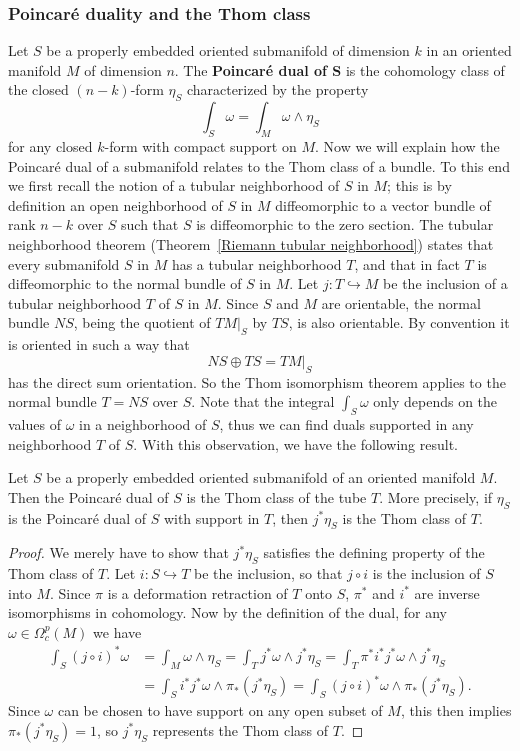 \subsubsection{Poincar\'e duality and the Thom class}
Let $S$ be a properly embedded oriented submanifold of dimension $k$ in an oriented manifold $M$ of dimension $n$. The \textbf{Poincar\'e dual of $\bm{S}$} is the 
cohomology class of the closed $(n-k)$-form $\eta_S$ characterized by the property
\[\int_S\omega=\int_M\omega\wedge\eta_S\]
for any closed $k$-form with compact support on $M$. Now we will explain how the Poincar\'e dual of a submanifold relates to the Thom class of a bundle. To this end we 
first recall the notion of a tubular neighborhood of $S$ in $M$; this is by definition an open neighborhood of $S$ in $M$ diffeomorphic to a vector bundle of rank $n-k$ 
over $S$ such that $S$ is diffeomorphic to the zero section. The tubular neighborhood theorem (Theorem~\ref{Riemann tubular neighborhood}) states that every submanifold 
$S$ in $M$ has a tubular neighborhood $T$, and that in fact $T$ is diffeomorphic to the normal bundle of $S$ in $M$. Let $j:T\hookrightarrow M$ be the inclusion of a 
tubular neighborhood $T$ of $S$ in $M$. Since $S$ and $M$ are orientable, the normal bundle $NS$, being the quotient of $TM|_S$ by $TS$, is also orientable. By 
convention it is oriented in such a way that
\[NS\oplus TS=TM|_S\]
has the direct sum orientation. So the Thom isomorphism theorem applies to the normal bundle $T=NS$ over $S$. Note that the integral $\int_S\omega$ only depends on the 
values of $\omega$ in a neighborhood of $S$, thus we can find duals supported in any neighborhood $T$ of $S$. With this observation, we have the following result.
\begin{proposition}\label{Thom class Poincare dual}
Let $S$ be a properly embedded oriented submanifold of an oriented manifold $M$. Then the Poincar\'e dual of $S$ is the Thom class of the tube $T$. More precisely, if 
$\eta_S$ is the Poincar\'e dual of $S$ with support in $T$, then $j^*\eta_S$ is the Thom class of $T$.
\end{proposition}
\begin{proof}
We merely have to show that $j^*\eta_S$ satisfies the defining property of the Thom class of $T$. Let $i:S\hookrightarrow T$ be the inclusion, so that $j\circ i$ is the 
inclusion of $S$ into $M$. Since $\pi$ is a deformation retraction of $T$ onto $S$, $\pi^*$ and $i^*$ are inverse isomorphisms in cohomology. Now by the definition of 
the dual, for any $\omega\in\Omega^p_c(M)$ we have
\begin{align*}
\int_S(j\circ i)^*\omega&=\int_M\omega\wedge\eta_S=\int_Tj^*\omega\wedge j^*\eta_S=\int_T\pi^*i^*j^*\omega\wedge j^*\eta_S\\
&=\int_Si^*j^*\omega\wedge\pi_*(j^*\eta_S)=\int_S(j\circ i)^*\omega\wedge\pi_*(j^*\eta_S).
\end{align*}
Since $\omega$ can be chosen to have support on any open subset of $M$, this then implies $\pi_*(j^*\eta_S)=1$, so $j^*\eta_S$ represents the Thom class of $T$.
\end{proof}
